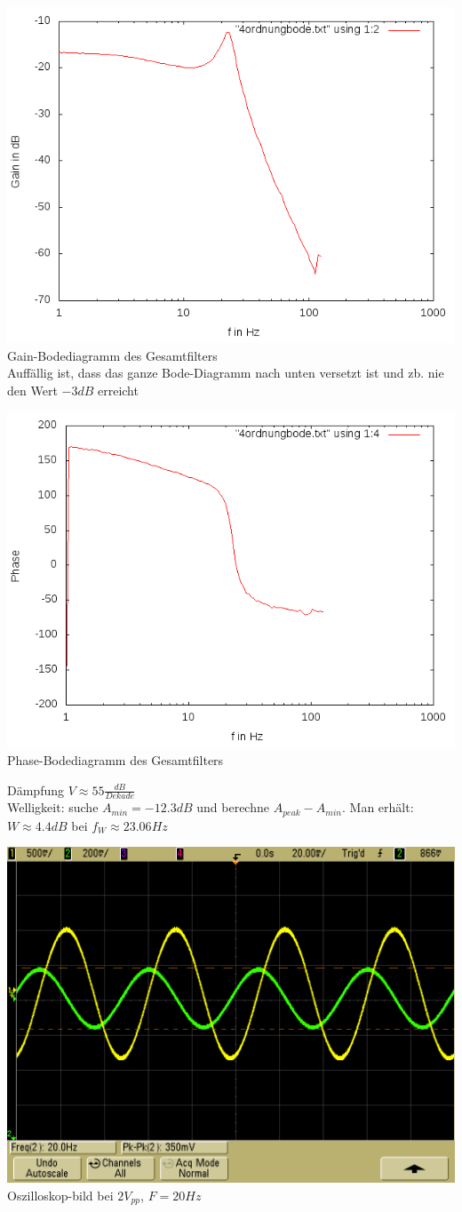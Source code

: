 \documentclass[compress,11pt]{beamer}
\begin{document}
\begin{frame}
\includegraphics[width=.7\textwidth]{4aufgabe/4stufegain}\\
Gain-Bodediagramm des Gesamtfilters\\
Auffällig ist, dass das ganze Bode-Diagramm nach unten versetzt ist und zb. nie den Wert $-3 dB $ erreicht
\end{frame}
\begin{frame}
\includegraphics[width=.7\textwidth]{4aufgabe/4stufephase}\\
Phase-Bodediagramm des Gesamtfilters
\end{frame}
\begin{frame}
Dämpfung $V \approx 55 \frac{dB}{Dekade}$\\
Welligkeit: suche $A_{min} = -12.3 dB$ und berechne $A_{peak} - A_{min}$. Man erhält: $W \approx 4.4 dB$
bei $f_W \approx 23.06 Hz$
\end{frame}
\begin{frame}
\includegraphics[width=.7\textwidth]{oszi/scope_64}\\
Oszilloskop-bild bei $2 V_{pp}$, $F = 20 Hz$
\end{frame}
\end{document}
